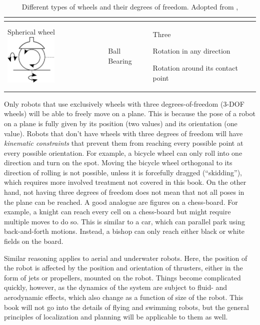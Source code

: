 \begin{table}
\begin{tabular}{p{2.8cm}p{3cm}p{4cm}}
\begin{compactitem}
\end{compactitem}\\
\hline
Spherical wheel \includegraphics[width=2.5cm]{figs/wheeltype_spherical.png}& Ball Bearing & Three
\begin{compactitem}
\item Rotation in any direction
\item Rotation around its contact point
\end{compactitem}\\
\hline
\end{tabular}
\caption{Different types of wheels and their degrees of freedom. Adopted from \protect{},\label{tab:wheels}}
\end{table}

Only robots that use exclusively wheels with three degrees-of-freedom (3-DOF wheels) will be able to freely move on a plane. This is because the pose of a robot on a plane is fully given by its position (two values) and its orientation (one value). Robots that don't have wheels with three degrees of freedom will have \emph{kinematic constraints} that prevent them from reaching every possible point at every possible orientation. For example, a bicycle wheel can only roll into one direction and turn on the spot. Moving the bicycle wheel orthogonal to its direction of rolling is not possible, unless it is forcefully dragged (``skidding''), which requires more involved treatment not covered in this book. On the other hand, not having three degrees of freedom does not mean that not all poses in the plane can be reached. 
A good analogue are figures on a chess-board. For example, a knight can reach every cell on a chess-board but might require multiple moves to do so. This is similar to a car, which can parallel park using back-and-forth motions. Instead, a bishop can only reach either black or white fields on the board. 

Similar reasoning applies to aerial and underwater robots. Here, the position of the robot is affected by the position and orientation of thrusters, either in the form of jets or propellers, mounted on the robot. Things become complicated quickly, however, as the dynamics of the system are subject to fluid- and aerodynamic effects, which also change as a function of size of the robot. This book will not go into the details of flying and swimming robots, but the general principles of localization and planning will be applicable to them as well.

